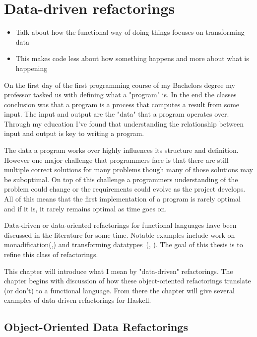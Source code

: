 \chapter{Data-driven refactorings}


\begin{itemize}
\item Talk about how the functional way of doing things focuses on transforming data 
\item This makes code less about how something happens and more about what is happening
\end{itemize}

On the first day of the first programming course of my Bachelors degree my professor tasked us with defining what a "program" is. In the end the classes conclusion was that a program is a process that computes a result from some input. The input and output are the "data" that a program operates over. Through my education I've found that understanding the relationship between input and output is key to writing a program.

The data a program works over highly influences its structure and definition. However one major challenge that programmers face is that there are still multiple correct solutions for many problems though many of those solutions may be suboptimal. On top of this challenge a programmers understanding of the problem could change or the requirements could evolve as the project develops. All of this means that the first implementation of a program is rarely optimal and if it is, it rarely remains optimal as time goes on. 

Data-driven or data-oriented refactorings for functional languages have been discussed in the literature for some time. Notable examples include work on monadification(\cite{monadification},\cite{monadSurvey}) and transforming datatypes~(\cite{datatypeTransformation}, \cite{brownThesis}).  The goal of this thesis is to refine this class of refactorings.

This chapter will introduce what I mean by "data-driven" refactorings. The chapter begins with discussion of how these object-oriented refactorings translate (or don't) to a functional language. From there the chapter will give several examples of data-driven refactorings for Haskell.

\section{Object-Oriented Data Refactorings}\label{ooRefs}


